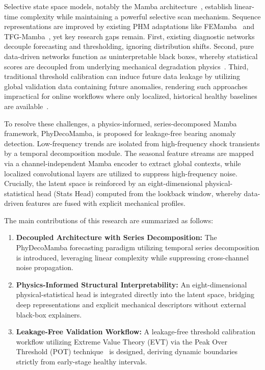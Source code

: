 \documentclass[runningheads]{llncs}
\begin{document}
 Selective state space models, notably the Mamba architecture~\cite{ref-5}, establish linear-time complexity while maintaining a powerful selective scan mechanism. Sequence representations are improved by existing PHM adaptations like FEMamba~\cite{ref-6} and TFG-Mamba~\cite{ref-7}, yet key research gaps remain. First, existing diagnostic networks decouple forecasting and thresholding, ignoring distribution shifts. Second, pure data-driven networks function as uninterpretable black boxes, whereby statistical scores are decoupled from underlying mechanical degradation physics~\cite{ref-8}. Third, traditional threshold calibration can induce future data leakage by utilizing global validation data containing future anomalies, rendering such approaches impractical for online workflows where only localized, historical healthy baselines are available~\cite{ref-9}.

 To resolve these challenges, a physics-informed, series-decomposed Mamba framework, PhyDecoMamba, is proposed for leakage-free bearing anomaly detection. Low-frequency trends are isolated from high-frequency shock transients by a temporal decomposition module. The seasonal feature streams are mapped via a channel-independent Mamba encoder to extract global contexts, while localized convolutional layers are utilized to suppress high-frequency noise. Crucially, the latent space is reinforced by an eight-dimensional physical-statistical head (Stats Head) computed from the lookback window, whereby data-driven features are fused with explicit mechanical profiles.

The main contributions of this research are summarized as follows:
\begin{enumerate}
    \item \textbf{Decoupled Architecture with Series Decomposition:} The PhyDecoMamba forecasting paradigm utilizing temporal series decomposition is introduced, leveraging linear complexity while suppressing cross-channel noise propagation.
    \item \textbf{Physics-Informed Structural Interpretability:} An eight-dimensional physical-statistical head is integrated directly into the latent space, bridging deep representations and explicit mechanical descriptors without external black-box explainers.
    \item \textbf{Leakage-Free Validation Workflow:} A leakage-free threshold calibration workflow utilizing Extreme Value Theory (EVT) via the Peak Over Threshold (POT) technique~\cite{ref-10} is designed, deriving dynamic boundaries strictly from early-stage healthy intervals.
\end{enumerate}
\end{document}
